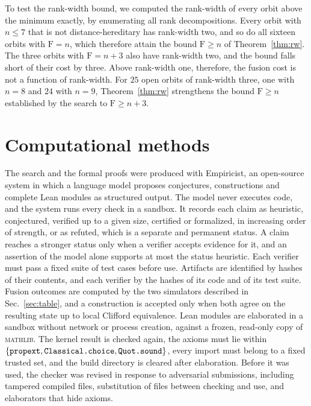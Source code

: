 \documentclass[aps,pra,onecolumn,superscriptaddress,nofootinbib,longbibliography]{revtex4-2}
\theoremstyle{plain}
\theoremstyle{remark}
\newcommand{\F}{\mathrm{F}}
\newcommand{\codeus}{\textunderscore\allowbreak}
\newcommand{\code}[1]{\texttt{\let\_\codeus #1}}
\begin{document}
To test the rank-width bound, we computed the rank-width of every orbit above the minimum exactly, by
enumerating all rank decompositions. Every orbit with $n\le 7$ that is not distance-hereditary has
rank-width two, and so do all sixteen orbits with $\F=n$, which therefore attain the bound $\F\ge n$ of
Theorem~\ref{thm:rw}. The three orbits with $\F=n+3$ also have rank-width two, and the bound falls short of
their cost by three. Above rank-width one, therefore, the fusion cost is not a function of rank-width. For
$25$ open orbits of rank-width three, one with $n=8$ and $24$ with $n=9$, Theorem~\ref{thm:rw} strengthens
the bound $\F\ge n$ established by the search to $\F\ge n+3$.

\section{Computational methods}\label{sec:method}

The search and the formal proofs were produced with Empiricist, an open-source system in which a language
model proposes conjectures, constructions and complete Lean modules as structured output. The model never
executes code, and the system runs every check in a sandbox. It records each claim as heuristic,
conjectured, verified up to a given size, certified or formalized, in increasing order of strength, or as
refuted, which is a separate and permanent status. A claim reaches a stronger status only when a verifier
accepts evidence for it, and an assertion of the model alone supports at most the status heuristic. Each
verifier must pass a fixed suite of test cases before use. Artifacts are identified by hashes of their
contents, and each verifier by the hashes of its code and of its test suite. Fusion outcomes are computed by the two simulators described in Sec.~\ref{sec:table}, and a
construction is accepted only when both agree on the resulting state up to local Clifford equivalence.
Lean modules are elaborated in a sandbox without network or process creation, against a frozen,
read-only copy of \textsc{mathlib}. The kernel result is checked again, the axioms must lie within
$\{\code{propext},\code{Classical.choice},\code{Quot.sound}\}$, every import must belong to a fixed trusted
set, and the build directory is cleared after elaboration. Before it was used, the checker was revised in
response to adversarial submissions, including tampered compiled files, substitution of files between
checking and use, and elaborators that hide axioms.
\end{document}

